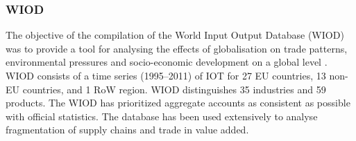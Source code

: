 \subsubsection{WIOD}

The objective of the compilation of the World Input Output Database (WIOD) was
to provide a tool for analysing the effects of globalisation on trade patterns,
environmental pressures and socio-economic development on a global level \cite{timmer_world_2012}. WIOD consists of a time series (1995–2011) of IOT for 27 EU
countries, 13 non-EU countries, and 1 RoW region. WIOD distinguishes 35
industries and 59 products. The WIOD has prioritized aggregate accounts as consistent as possible with official statistics. The database has been used extensively to analyse fragmentation of supply chains and trade in value added.
